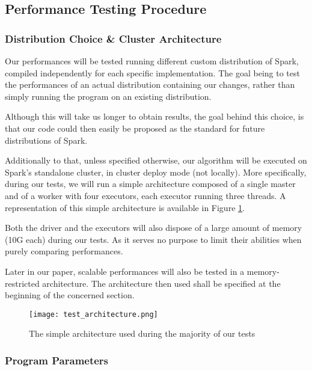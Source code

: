 \documentclass{eplmastersthesis}
\begin{document}
\subsection{Performance Testing Procedure}
\subsubsection{Distribution Choice \& Cluster Architecture}

Our performances will be tested running different custom distribution of Spark, compiled independently for each specific implementation. The goal being to test the performances of an actual distribution containing our changes, rather than simply running the program on an existing distribution. \newline

Although this will take us longer to obtain results, the goal behind this choice, is that our code could then easily be proposed as the standard for future distributions of Spark.  \newline

Additionally to that, unless specified otherwise, our algorithm will be executed on Spark's standalone cluster, in cluster deploy mode (not locally). More specifically, during our tests, we will run a simple architecture composed of a single master and of a worker with four executors, each executor running three threads. A representation of this simple architecture is available in Figure \ref{fig:test_architecture}.\newline

Both the driver and the executors will also dispose of a large amount of memory (10G each) during our tests. As it serves no purpose to limit their abilities when purely comparing performances. \newline

Later in our paper, scalable performances will also be tested in a memory-restricted architecture. The architecture then used shall be specified at the beginning of the concerned section.

\begin{figure}[h]
  \centering
  \texttt{[image: test\_architecture.png]}
  \caption{The simple architecture used during the majority of our tests}
  \label{fig:test_architecture}
\end{figure}

\subsubsection{Program Parameters}
\end{document}
